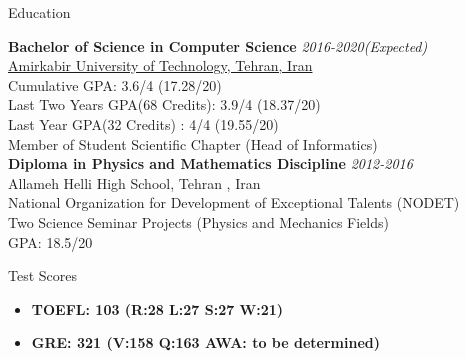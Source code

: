 \documentclass{resume} %
\begin{document}
	
	
	\begin{rSection}{Education}
		
		{\bf Bachelor of Science in Computer Science} \hfill {\em 2016-2020(Expected)} \\ 
		\href{https://www.topuniversities.com/universities/amirkabir-university-technology}{Amirkabir University of Technology, Tehran, Iran}\\
		Cumulative GPA: 3.6/4 (17.28/20)\\
		Last Two Years GPA(68 Credits): 3.9/4 (18.37/20)\\
		Last Year GPA(32 Credits) : 4/4 (19.55/20)\\
		Member of Student Scientific Chapter (Head of Informatics) \\
		
		{\bf Diploma in Physics and Mathematics Discipline} \hfill {\em 2012-2016}\\ 
		Allameh Helli High School, Tehran , Iran\\
		National Organization for Development of Exceptional Talents (NODET)\\
		Two Science Seminar Projects (Physics and Mechanics Fields)\\
		GPA: 18.5/20\\
		
	\end{rSection}
	
	\begin{rSection}{Test Scores}
		\begin{itemize}{\bfseries}
			\item {\bfseries TOEFL: 103 (R:28 L:27 S:27 W:21)}
			\item {\bfseries GRE: 321 (V:158 Q:163 AWA: to be determined)}
		\end{itemize}
		
	\end{rSection}
	
	
\end{document}
